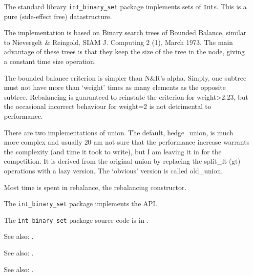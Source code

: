 
The standard library {\tt int\_binary\_set} package implements sets of 
{\tt Int}s. This is a pure (side-effect free) datastructure.  

The implementation is based on Binary search trees of Bounded 
Balance, similar to Nievergelt & Reingold, SIAM J. Computing 
2 (1), March 1973.  The main advantage of these trees is that 
they keep the size of the tree in the node, giving a constant 
time size operation.

The bounded balance criterion is simpler than N&R's alpha. 
Simply, one subtree must not have more than `weight' times as 
many elements as the opposite subtree.  Rebalancing is 
guaranteed to reinstate the criterion for weight>2.23, but 
the occasional incorrect behaviour for weight=2 is not 
detrimental to performance.

There are two implementations of union.  The default, 
hedge\_union, is much more complex and usually 20%
am not sure that the performance increase warrants the 
complexity (and time it took to write), but I am leaving it 
in for the competition.  It is derived from the original 
union by replacing the split\_lt (gt) operations with a lazy 
version. The `obvious' version is called old\_union.

Most time is spent in rebalance, the rebalancing constructor.

The {\tt int\_binary\_set} package implements the  API.

The {\tt int\_binary\_set} package source code is in .

See also:  .

See also:  .

See also:  .


